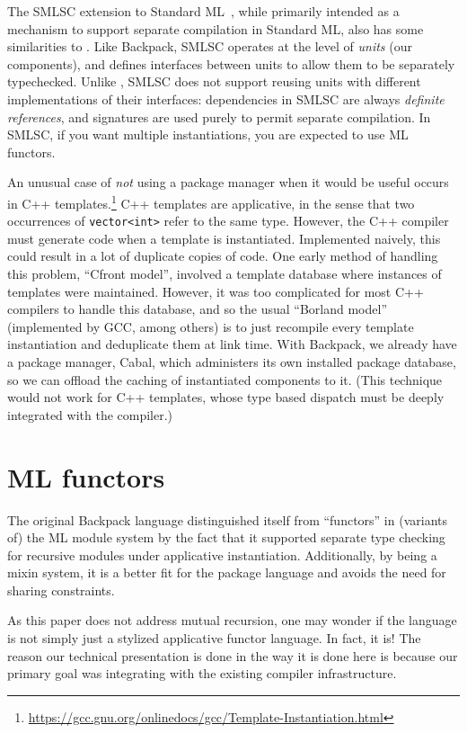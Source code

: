 The SMLSC extension to Standard ML~\cite{swasey+:smlsc}, while
primarily intended as a mechanism to support separate compilation in
Standard ML, also has some similarities to \Backpack{}.  Like
Backpack, SMLSC operates at the level of \emph{units} (our
components), and defines interfaces between units to allow them to be
separately typechecked.  Unlike \Backpack{}, SMLSC does not support
reusing units with different
implementations of their interfaces: dependencies in SMLSC are always
\emph{definite references}, and signatures are used purely to permit
separate compilation.  In SMLSC, if you want multiple instantiations,
you are expected to use ML functors.

An unusual case of \emph{not} using a package manager when it would be
useful occurs in C++ templates.\footnote{\smaller%
  \url{https://gcc.gnu.org/onlinedocs/gcc/Template-Instantiation.html}}
C++ templates are
applicative, in the sense that two occurrences of \verb|vector<int>| refer to the
same type.  However, the C++ compiler must generate code when a
template is instantiated. Implemented naively, this could result in a
lot of duplicate copies of code.  One early method of handling this
problem, ``Cfront model'', involved a template database where
instances of templates were maintained.  However, it was too
complicated for most C++ compilers to handle this database, and so the
usual ``Borland model'' (implemented by GCC, among others) is to just
recompile every template instantiation and deduplicate them at link
time.  With Backpack, we already have a package manager, Cabal, which
administers its own installed package database, so we can offload the
caching of instantiated components to it.  (This technique would not
work for C++ templates, whose type based dispatch must be deeply
integrated with the compiler.)

\section{ML functors}

The original Backpack language distinguished
itself from ``functors'' in (variants of) the ML module system
\cite{milner+:def-of-sml-revised,ocaml} by the fact that it supported
separate type checking for recursive modules under applicative
instantiation.  Additionally, by being a mixin system, it is a
better fit for the package language and avoids the need for
sharing constraints.

As this paper does not address mutual recursion, one may wonder
if the \unit{} language is not simply just a stylized applicative
functor language. In fact, it is!  The reason our technical presentation
is done in the way it is done here is because our primary goal
was integrating with the existing compiler infrastructure.

